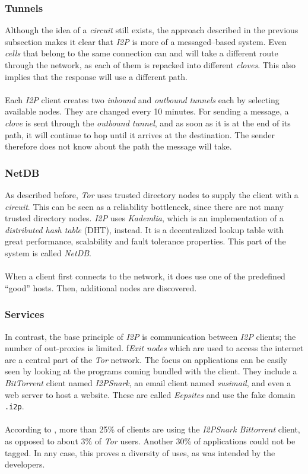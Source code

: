 \documentclass{sig-alternate}
\begin{document}
\subsubsection{Tunnels}
Although the idea of a \emph{circuit} still exists, the approach described in the previous subsection makes it clear that \emph{I2P} is more of a messaged--based system.
Even \emph{cells} that belong to the same connection can and will take a different route through the network, as each of them is repacked into different \emph{cloves}.
This also implies that the response will use a different path.
\\
\\
Each \emph{I2P} client creates two \emph{inbound} and \emph{outbound} \emph{tunnels} each by selecting available nodes.
They are changed every 10 minutes.
For sending a message, a \emph{clove} is sent through the \emph{outbound tunnel}, and as soon as it is at the end of its path, it will continue to hop until it arrives at the destination.
The sender therefore does not know about the path the message will take\cite{olivier2011}.
\subsubsection{NetDB}
As described before, \emph{Tor} uses trusted directory nodes to supply the client with a \emph{circuit}.
This can be seen as a reliability bottleneck, since there are not many trusted directory nodes.
\emph{I2P} uses \emph{Kademlia}, which is an implementation of a \emph{distributed hash table} (DHT), instead.
It is a decentralized lookup table with great performance, scalability and fault tolerance properties.
This part of the system is called \emph{NetDB}.
\\
\\
When a client first connects to the network, it does use one of the predefined ``good'' hosts.
Then, additional nodes are discovered.

\subsubsection{Services}
In contrast, the base principle of \emph{I2P} is communication between \emph{I2P} clients; the number of out-proxies is limited\cite{olivier2011}.
f\emph{Exit nodes} which are used to access the internet are a central part of the \emph{Tor} network.
The focus on applications can be easily seen by looking at the programs coming bundled with the client.
They include a \emph{BitTorrent} client named \emph{I2PSnark}, an email client named \emph{susimail}, and even a web server to host a website\cite{i2p}.
These are called \emph{Eepsites} and use the fake domain \texttt{.i2p}.
\\
\\
According to \cite{olivier2011}, more than 25\% of clients are using the \emph{I2PSnark Bittorrent} client, as opposed to about 3\% of \emph{Tor} users.
Another 30\% of applications could not be tagged.
In any case, this proves a diversity of uses, as was intended by the developers.
\end{document}
